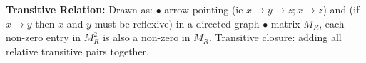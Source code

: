 \documentclass{article}
\begin{document}
\textbf{Transitive Relation:}
\newline
\newline
{}
\newline 
\newline
Drawn as:
\newline
$\bullet $ arrow pointing (ie $x \rightarrow y \rightarrow z; x \rightarrow z$) and (if $x \rightarrow y$ then $x$ and $y$ must be reflexive) in a directed graph
\newline
$\bullet $ matrix $M_R$, each non-zero entry in $M^2_R$ is also a non-zero in $M_R$. 
\newline 
{}
\newline
\newline
Transitive closure: adding all relative transitive pairs together. 
\newpage
\end{document}
